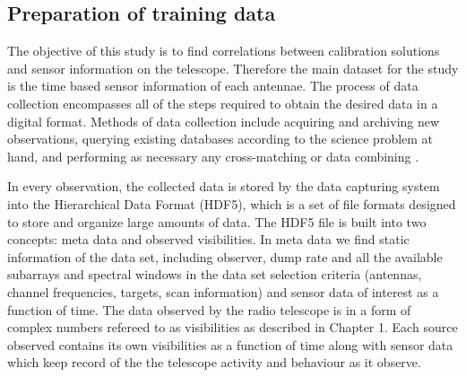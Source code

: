 \subsection{Preparation of training data}\label{prep}

The objective of this study is to find correlations between
calibration solutions and sensor information on the telescope.
Therefore the main dataset for the study is the time based
sensor information of each antennae.
The process of data collection encompasses all of the steps required to obtain the desired data in a digital format. Methods of data collection include acquiring and archiving new observations, querying existing databases according to the science
problem at hand, and performing as necessary any cross-matching or data combining  \citep{ball2010data}.


In every observation, the collected data is stored by the data capturing system into the Hierarchical Data Format (HDF5), which is a set of file formats designed to store and organize large amounts of data. The HDF5 file is built into two concepts: meta data and observed visibilities. In meta data we find static information of the data set, including observer, dump rate and all the available subarrays and spectral windows in the data set selection criteria (antennas, channel frequencies, targets, scan information) and sensor data of interest as a function of time. The data observed by the radio telescope is in a form of complex numbers refereed to as visibilities as described in Chapter 1. Each source observed contains its own visibilities as a function of time along with sensor data  which keep record of the the telescope activity and behaviour as it observe.


